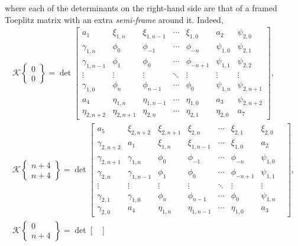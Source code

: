 \documentclass[10pt,a4paper]{amsart}
\numberwithin{equation}{section}
\newcommand{\ga}{\gamma}
\begin{document}
		where each of the determinants on the right-hand side are that of a framed Toeplitz matrix with an extra \textit{semi-frame} around it. Indeed,
		\begin{gather*}
			\mathscr{K}\left\lbrace \begin{matrix} 0 \\ 0 \end{matrix} \right\rbrace = \det \begin{bmatrix}
				a_1 & \xi_{1,n} & \xi_{1,n-1} & \cdots & \xi_{1,0} & a_2 & \psi_{2,0} \\
				\ga_{1,n} &	\phi_0& \phi_{-1} & \cdots & \phi_{-n} & \psi_{1,0} & \psi_{2,1} \\
				\ga_{1,n-1} &	\phi_{1}& \phi_0 & \cdots & \phi_{-n+1} & \psi_{1,1} & \psi_{2,2} \\
				\vdots & \vdots & \vdots & \ddots & \vdots & \vdots & \vdots \\
				\ga_{1,0} &	\phi_{n} & \phi_{n-1} & \cdots & \phi_{0} & \psi_{1,n} & \psi_{2,n+1} \\
				a_4 &	\eta_{1,n} & \eta_{1,n-1} & \cdots & \eta_{1,0} & a_3 & \psi_{2,n+2} \\
				\eta_{2,n+2} &	\eta_{2,n+1} & \eta_{2,n} & \cdots & \eta_{2,1} & \eta_{2,0} & a_7
			\end{bmatrix},
\\
			\mathscr{K}\left\lbrace \begin{matrix} n+4 \\ n+4 \end{matrix} \right\rbrace	= \det	\begin{bmatrix}
				a_5 & \xi_{2,n+2} & \xi_{2,n+1} & \xi_{2,n} & \cdots & \xi_{2,1} & \xi_{2,0} \\
				\ga_{2,n+2} &	a_1 & \xi_{1,n} & \xi_{1,n-1} & \cdots & \xi_{1,0} & a_2 \\
				\ga_{2,n+1} &	\ga_{1,n} &	\phi_0& \phi_{-1} & \cdots & \phi_{-n} & \psi_{1,0} \\
				\ga_{2,n} &	\ga_{1,n-1} &	\phi_{1}& \phi_0 & \cdots & \phi_{-n+1} & \psi_{1,1} \\
				\vdots &	\vdots & \vdots & \vdots & \ddots & \vdots & \vdots \\
				\ga_{2,1} &	\ga_{1,0} &	\phi_{n} & \phi_{n-1} & \cdots & \phi_{0} & \psi_{1,n} \\
				\ga_{2,0} &	a_4 &	\eta_{1,n} & \eta_{1,n-1} & \cdots & \eta_{1,0} & a_3 &
			\end{bmatrix},
\\
			\mathscr{K}\left\lbrace \begin{matrix} 0 \\ n+4 \end{matrix} \right\rbrace	= \det \begin{bmatrix}

\end{bmatrix}
\end{gather*}
\end{document}
